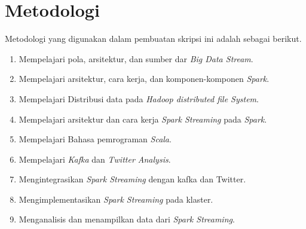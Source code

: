 \section{Metodologi}
Metodologi yang digunakan dalam pembuatan skripsi ini adalah sebagai berikut.
\begin{enumerate}
	\item Mempelajari pola, arsitektur, dan sumber dar \textit{Big Data Stream}.
	\item Mempelajari arsitektur, cara kerja, dan komponen-komponen \textit{Spark}.
	\item Mempelajari Distribusi data pada \textit{Hadoop distributed file System}.
	\item Mempelajari arsitektur dan cara kerja \textit{Spark Streaming} pada \textit{Spark}.
	\item Mempelajari Bahasa pemrograman \textit{Scala}.
	\item Mempelajari \textit{Kafka} dan \textit{Twitter Analysis}.
	\item Mengintegrasikan \textit{Spark Streaming} dengan kafka dan Twitter. 
	\item Mengimplementasikan \textit{Spark Streaming} pada klaster.
	\item Menganalisis dan menampilkan data dari \textit{Spark Streaming}. 
\end{enumerate}
\label{sec:metlit}


